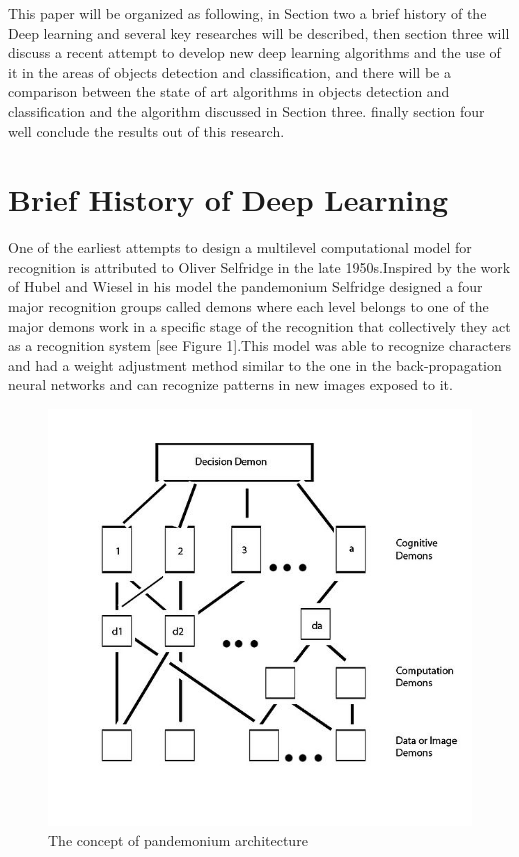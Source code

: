 \documentclass[12pt,twoside]{article}
\theoremstyle{plain}
\theoremstyle{definition}
\theoremstyle{remark}
\begin{document}
This paper will be organized as following, in Section two a brief history of the Deep learning  and several key researches will be described, then section three will discuss a recent attempt to develop new deep learning algorithms and the use of it in the areas of objects detection and classification,  and there will be a comparison between the state of art algorithms in objects detection and classification and the algorithm discussed in Section three. finally section four well conclude the results out of this research.

\section{Brief History of Deep Learning}
One of the earliest attempts to design a multilevel computational model for recognition  is attributed to Oliver Selfridge \cite{Selfridge1958} in the late 1950s.Inspired by the work of Hubel and Wiesel \cite{Hubel1959} in his model the pandemonium Selfridge designed a four major recognition groups called demons where each level belongs to one of the major demons work in a specific stage of the recognition that collectively they act as a recognition system [see Figure 1].This model was able to recognize characters and had a weight adjustment method similar to the one in the back-propagation neural networks and can recognize patterns in new images exposed to it.
\begin{figure}[hbtp]
\centering
\includegraphics[scale=.65]{Images/Original_pande2.jpg}
\caption{The concept of pandemonium architecture }
\end{figure}
\end{document}
